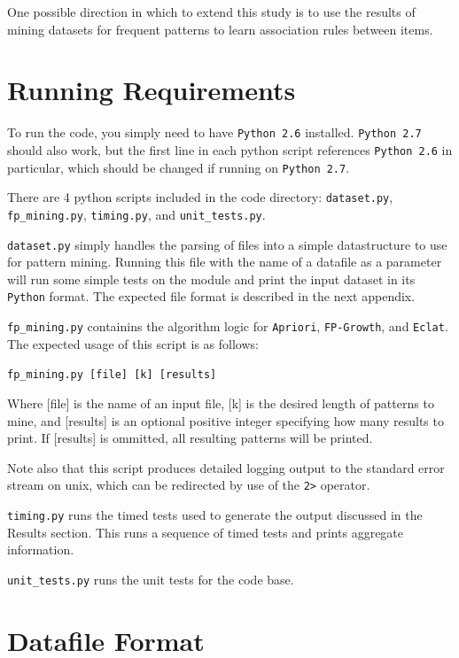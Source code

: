 \documentclass[11pt]{article}
\begin{document}
\begin{multicols}{2}
One possible direction in which to extend this study is to use the
results of mining datasets for frequent patterns to learn association
rules between items. \cite{wiki_arl}

\appendix
\section{Running Requirements}

To run the code, you simply need to have \texttt{Python 2.6}
installed.  \texttt{Python 2.7} should also work, but the first line
in each python script references \texttt{Python 2.6} in particular,
which should be changed if running on \texttt{Python 2.7}.

There are 4 python scripts included in the code directory:
\texttt{dataset.py}, \texttt{fp\_mining.py}, \texttt{timing.py}, and
\texttt{unit\_tests.py}.

\texttt{dataset.py} simply handles the parsing of files into a simple
datastructure to use for pattern mining.  Running this file with the
name of a datafile as a parameter will run some simple tests on the
module and print the input dataset in its \texttt{Python} format.  The
expected file format is described in the next appendix.

\texttt{fp\_mining.py} containins the algorithm logic for
\texttt{Apriori}, \texttt{FP-Growth}, and \texttt{Eclat}.  The
expected usage of this script is as follows:

\texttt{fp\_mining.py [file] [k] [results]}

Where [file] is the name of an input file, [k] is the desired length
of patterns to mine, and [results] is an optional positive integer
specifying how many results to print.  If [results] is ommitted, all
resulting patterns will be printed.

Note also that this script produces detailed logging output to the
standard error stream on unix, which can be redirected by use of the
\texttt{2>} operator.

\texttt{timing.py} runs the timed tests used to generate the output
discussed in the Results section.  This runs a sequence
of timed tests and prints aggregate information.

\texttt{unit\_tests.py} runs the unit tests for the code base.

\section{Datafile Format}


\end{multicols}
\end{document}
